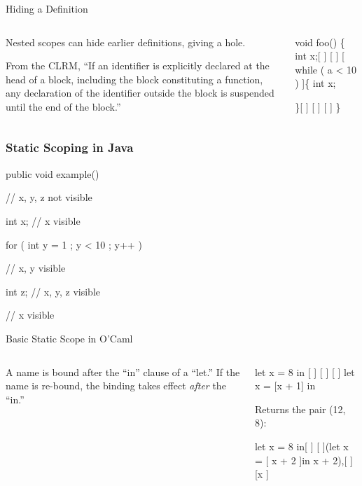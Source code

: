 \documentclass{plt}
\begin{document}
\begin{frame}[fragile]{Hiding a Definition}

  \begin{columns}
    \begin{column}{0.5\textwidth}
\parskip=1pc
Nested scopes can hide earlier definitions, giving a hole.

From the CLRM, ``If an identifier is explicitly declared at the head
of a block, including the block constituting a function, any
declaration of the identifier outside the block is suspended until the
end of the block.''
    \end{column}
    \begin{column}{0.5\textwidth}
\begin{showscope}
void foo()
\{
  int x;[                  ]
[                          ]
[  while ( a < 10 ) ]\{      
    int x;

  \}[                       ]
[                          ]
[                          ]
\}%
\end{showscope}
    \end{column}
  \end{columns}
\end{frame}

\begin{frame}[fragile]
  \frametitle{Static Scoping in Java}

\begin{java}
public void example() {
  // x, y, z not visible

  int x;
  // x visible

  for ( int y = 1 ; y < 10 ; y++ ) {
    // x, y visible

    int z;
    // x, y, z visible
  }

  // x visible
}
\end{java}

\end{frame}

\begin{frame}[fragile]{Basic Static Scope in O'Caml}
  \begin{columns}
    \begin{column}{0.5\textwidth}
A name is bound after the ``in'' clause of a ``let.''  If the name is
re-bound, the binding takes effect \emph{after} the ``in.''
    \end{column}
    \begin{column}{0.5\textwidth}
\begin{showscope}
let x = 8 in [             ]
[                          ]
[                          ]
let x = [x + 1] in

\end{showscope}

Returns the pair (12, 8):

\begin{showscope}
let x = 8 in[              ]
[  ](let x = [ x + 2 ]in
    x + 2),[               ]
[x                         ]%
\end{showscope}

    \end{column}
  \end{columns}
\end{frame}
\end{document}
